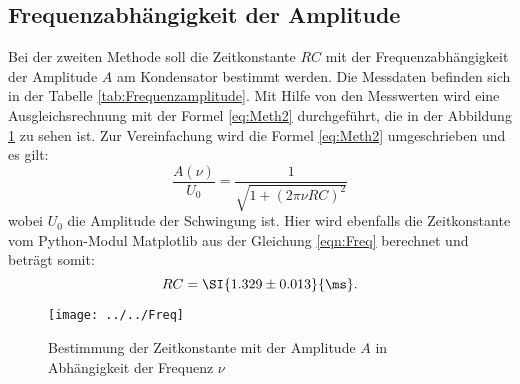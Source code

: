 \subsection{Frequenzabhängigkeit der Amplitude}
Bei der zweiten Methode soll die Zeitkonstante $RC$ mit der Frequenzabhängigkeit der Amplitude $A$ am Kondensator bestimmt werden. Die Messdaten befinden sich in der Tabelle \ref{tab:Frequenzamplitude}. Mit Hilfe von den Messwerten wird eine Ausgleichsrechnung mit der Formel \ref{eq:Meth2} durchgeführt, die in der Abbildung \ref{fig:freq} zu sehen ist. Zur Vereinfachung wird die Formel \ref{eq:Meth2} umgeschrieben und es gilt:
\begin{equation}
\label{eqn:Freq}
\frac{A(\nu)}{U_0} = \frac{1}{\sqrt{1+(2 \pi \nu RC)^{2}}}
\end{equation}
wobei $U_{0}$ die Amplitude der Schwingung ist. 
Hier wird ebenfalls die Zeitkonstante vom Python-Modul Matplotlib aus der Gleichung \ref{eqn:Freq} berechnet und beträgt somit:
\begin{equation*}
RC = \SI{1.329 \pm 0.013}{\ms}.
\end{equation*}
\begin{figure}[h!]
	\centering
	\texttt{[image: ../../Freq]}
	\caption{Bestimmung der Zeitkonstante mit der Amplitude $A$ in Abhängigkeit der Frequenz $\nu$}
	\label{fig:freq}
\end{figure}
